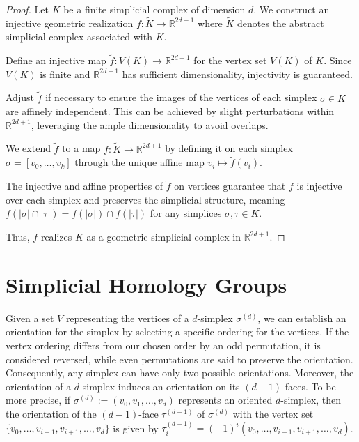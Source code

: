 \begin{proof}
Let \(K\) be a finite simplicial complex of dimension \(d\). We construct an injective geometric realization \( f: \tilde{K} \to \mathbb{R}^{2d+1} \) where \( \tilde{K} \) denotes the abstract simplicial complex associated with \( K \).

Define an injective map \( \tilde{f}: V(K) \to \mathbb{R}^{2d+1} \) for the vertex set \( V(K) \) of \( K \). Since \( V(K) \) is finite and \(\mathbb{R}^{2d+1}\) has sufficient dimensionality, injectivity is guaranteed.

Adjust \( \tilde{f} \) if necessary to ensure the images of the vertices of each simplex \(\sigma \in K\) are affinely independent. This can be achieved by slight perturbations within \(\mathbb{R}^{2d+1}\), leveraging the ample dimensionality to avoid overlaps.

We extend \( \tilde{f} \) to a map \( f: \tilde{K} \to \mathbb{R}^{2d+1} \) by defining it on each simplex \(\sigma = [v_0, \ldots, v_k]\) through the unique affine map $v_i \mapsto \tilde{f}(v_i)$.

The injective and affine properties of \( \tilde{f} \) on vertices guarantee that \( f \) is injective over each simplex and preserves the simplicial structure, meaning \( f(|\sigma| \cap |\tau|) = f(|\sigma|) \cap f(|\tau|) \) for any simplices \(\sigma, \tau \in K\).

Thus, \( f \) realizes \( K \) as a geometric simplicial complex in \(\mathbb{R}^{2d+1}\).
\end{proof}

\section{Simplicial Homology Groups}
Given a set $V$ representing the vertices of a $d$-simplex $\sigma^{(d)}$, we can establish an orientation for the simplex by selecting a specific ordering for the vertices. If the vertex ordering differs from our chosen order by an odd permutation, it is considered reversed, while even permutations are said to preserve the orientation. Consequently, any simplex can have only two possible orientations. Moreover, the orientation of a $d$-simplex induces an orientation on its $(d-1)$-faces. To be more precise, if $\sigma^{(d)} := (v_0, v_1, \ldots, v_d)$ represents an oriented $d$-simplex, then the orientation of the $(d-1)$-face $\tau^{(d-1)}$ of $\sigma^{(d)}$ with the vertex set $\{v_0,\ldots,v_{i-1},v_{i+1},\ldots,v_d\}$ is given by $\tau_i^{(d-1)} = (-1)^i (v_0, \ldots,v_{i-1},v_{i+1},\ldots,v_d)$.

